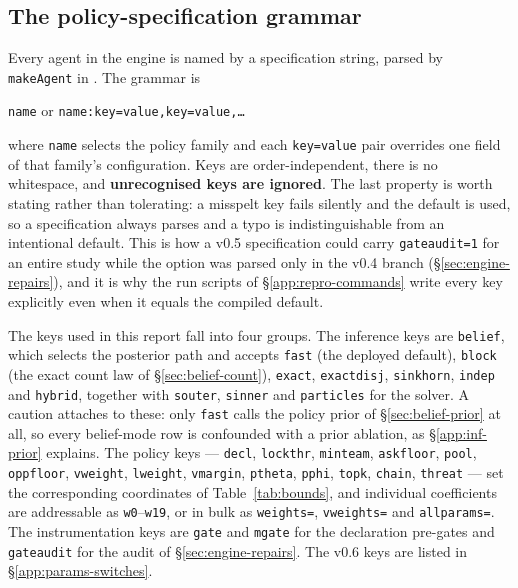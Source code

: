 \subsection{The policy-specification grammar}
\label{app:params-grammar}

Every agent in the engine is named by a specification string, parsed by
\texttt{makeAgent} in . The grammar is

\begin{center}
\texttt{name} \quad or \quad \texttt{name:key=value,key=value,\dots}
\end{center}

\noindent where \texttt{name} selects the policy family and each
\texttt{key=value} pair overrides one field of that family's configuration. Keys
are order-independent, there is no whitespace, and \textbf{unrecognised keys are
ignored}. The last property is worth stating rather than tolerating: a misspelt
key fails silently and the default is used, so a specification always parses and
a typo is indistinguishable from an intentional default. This is how a v0.5
specification could carry \texttt{gateaudit=1} for an entire study while the
option was parsed only in the v0.4 branch (\S\ref{sec:engine-repairs}), and it is
why the run scripts of \S\ref{app:repro-commands} write every key explicitly even
when it equals the compiled default.

The keys used in this report fall into four groups. The inference keys are
\texttt{belief}, which selects the posterior path and accepts \texttt{fast} (the
deployed default), \texttt{block} (the exact count law of
\S\ref{sec:belief-count}), \texttt{exact}, \texttt{exactdisj}, \texttt{sinkhorn},
\texttt{indep} and \texttt{hybrid}, together with \texttt{souter},
\texttt{sinner} and \texttt{particles} for the solver. A caution attaches to
these: only \texttt{fast} calls the policy prior of \S\ref{sec:belief-prior} at
all, so every belief-mode row is confounded with a prior ablation, as
\S\ref{app:inf-prior} explains. The policy keys --- \texttt{decl},
\texttt{lockthr}, \texttt{minteam}, \texttt{askfloor}, \texttt{pool},
\texttt{oppfloor}, \texttt{vweight}, \texttt{lweight}, \texttt{vmargin},
\texttt{ptheta}, \texttt{pphi}, \texttt{topk}, \texttt{chain},
\texttt{threat} --- set the corresponding coordinates of
Table~\ref{tab:bounds}, and individual coefficients are addressable as
\texttt{w0}--\texttt{w19}, or in bulk as \texttt{weights=},
\texttt{vweights=} and \texttt{allparams=}. The instrumentation keys are
\texttt{gate} and \texttt{mgate} for the declaration pre-gates and
\texttt{gateaudit} for the audit of \S\ref{sec:engine-repairs}. The v0.6 keys are
listed in \S\ref{app:params-switches}.

